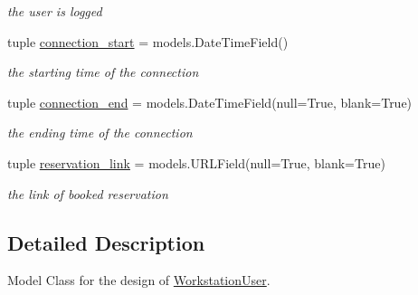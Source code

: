 \begin{DoxyCompactItemize}
\begin{DoxyCompactList}\small\item\em the user is logged \end{DoxyCompactList}\item 
\hypertarget{classrestriction__system_1_1models_1_1WorkstationUser_a87e890688f5ae73b641333d520bf7473}{}tuple \hyperlink{classrestriction__system_1_1models_1_1WorkstationUser_a87e890688f5ae73b641333d520bf7473}{connection\+\_\+start} = models.\+Date\+Time\+Field()\label{classrestriction__system_1_1models_1_1WorkstationUser_a87e890688f5ae73b641333d520bf7473}

\begin{DoxyCompactList}\small\item\em the starting time of the connection \end{DoxyCompactList}\item 
\hypertarget{classrestriction__system_1_1models_1_1WorkstationUser_af087ce77e3edd8f48ade722b279d261b}{}tuple \hyperlink{classrestriction__system_1_1models_1_1WorkstationUser_af087ce77e3edd8f48ade722b279d261b}{connection\+\_\+end} = models.\+Date\+Time\+Field(null=True, blank=True)\label{classrestriction__system_1_1models_1_1WorkstationUser_af087ce77e3edd8f48ade722b279d261b}

\begin{DoxyCompactList}\small\item\em the ending time of the connection \end{DoxyCompactList}\item 
\hypertarget{classrestriction__system_1_1models_1_1WorkstationUser_a3dbb71b0b34a1da890126247fba5e128}{}tuple \hyperlink{classrestriction__system_1_1models_1_1WorkstationUser_a3dbb71b0b34a1da890126247fba5e128}{reservation\+\_\+link} = models.\+U\+R\+L\+Field(null=True, blank=True)\label{classrestriction__system_1_1models_1_1WorkstationUser_a3dbb71b0b34a1da890126247fba5e128}

\begin{DoxyCompactList}\small\item\em the link of booked reservation \end{DoxyCompactList}\end{DoxyCompactItemize}


\subsection{Detailed Description}
Model Class for the design of \hyperlink{classrestriction__system_1_1models_1_1WorkstationUser}{Workstation\+User}. 

